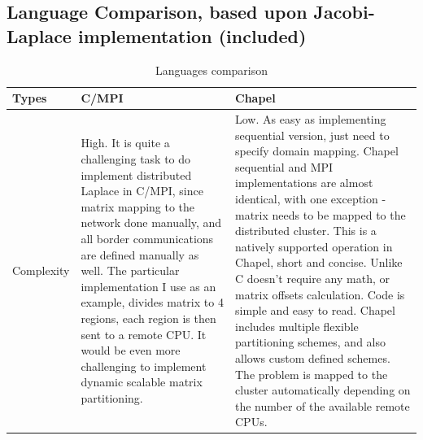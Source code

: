 \documentclass{article}
\begin{document}
        \subsection{Language Comparison, based upon Jacobi-Laplace implementation (included)}
        \begin{centering}
        \begin{table}[h!]
            \centering
            \caption{Languages comparison}
            \label{my-label}
            \begin{tabular}{l| p{7.5cm} | p{7.5cm}} \hline
              Types             &  C/MPI & Chapel \\ \hline
              Complexity 
                    & High. It is quite a challenging task to do implement distributed Laplace in C/MPI, since matrix
                    mapping to the network done manually, and all border communications are
                    defined manually as well.
                    The particular implementation I use as an example, divides matrix to 4 regions,
                    each region is then sent to a remote CPU. It would be even more challenging to 
                    implement dynamic scalable matrix partitioning.  

                    &  Low. As easy as implementing sequential version, just need to
                        specify domain mapping. Chapel sequential and MPI implementations are almost
                        identical, with one exception - matrix needs to be mapped to the distributed
                        cluster. This is a natively supported operation in Chapel, short and
                        concise. Unlike C doesn't require any math, or matrix offsets calculation.
                        Code is simple and easy to read. Chapel includes multiple flexible
                        partitioning schemes, and also allows custom defined schemes. The problem is
                        mapped to the cluster automatically depending on the number of the available remote CPUs.
                    

\end{tabular}
\end{table}
\end{centering}
\end{document}
